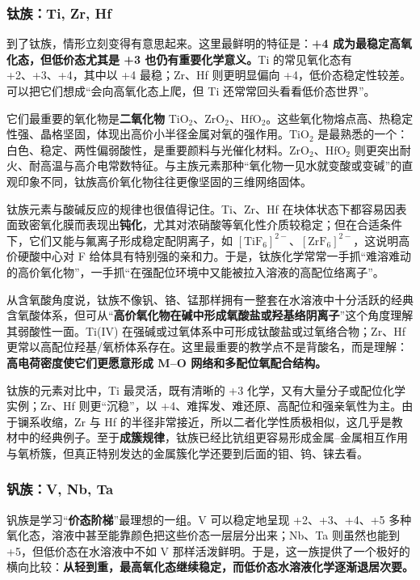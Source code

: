 \documentclass[UTF8]{ctexbook}
\begin{document}
\subsubsection{钛族：Ti, Zr, Hf}

到了钛族，情形立刻变得有意思起来。这里最鲜明的特征是：\textbf{+4 成为最稳定高氧化态，但低价态尤其是 +3 也仍有重要化学意义。}Ti 的常见氧化态有 +2、+3、+4，其中以 +4 最稳；Zr、Hf 则更明显偏向 +4，低价态稳定性较差。可以把它们想成“会向高氧化态上爬，但 Ti 还常常回头看看低价态世界”。

它们最重要的氧化物是\textbf{二氧化物} $\mathrm{TiO_2}$、$\mathrm{ZrO_2}$、$\mathrm{HfO_2}$。这些氧化物熔点高、热稳定性强、晶格坚固，体现出高价小半径金属对氧的强作用。$\mathrm{TiO_2}$ 是最熟悉的一个：白色、稳定、两性偏弱酸性，是重要颜料与光催化材料。$\mathrm{ZrO_2}$、$\mathrm{HfO_2}$ 则更突出耐火、耐高温与高介电常数特征。与主族元素那种“氧化物一见水就变酸或变碱”的直观印象不同，钛族高价氧化物往往更像坚固的三维网络固体。

钛族元素与酸碱反应的规律也很值得记住。Ti、Zr、Hf 在块体状态下都容易因表面致密氧化膜而表现出\textbf{钝化}，尤其对浓硝酸等氧化性介质较稳定；但在合适条件下，它们又能与氟离子形成稳定配阴离子，如 $\mathrm{[TiF_6]^{2-}}$、$\mathrm{[ZrF_6]^{2-}}$，这说明高价硬酸中心对 F 给体具有特别强的亲和力。于是，钛族化学常常一手抓“难溶难动的高价氧化物”，一手抓“在强配位环境中又能被拉入溶液的高配位络离子”。

从含氧酸角度说，钛族不像钒、铬、锰那样拥有一整套在水溶液中十分活跃的经典含氧酸体系，但可从“\textbf{高价氧化物在碱中形成氧酸盐或羟基络阴离子}”这个角度理解其弱酸性一面。Ti(IV) 在强碱或过氧体系中可形成钛酸盐或过氧络合物；Zr、Hf 更常以高配位羟基/氧桥体系存在。这里最重要的教学点不是背酸名，而是理解：\textbf{高电荷密度使它们更愿意形成 M--O 网络和多配位氧配合结构。}

钛族的元素对比中，Ti 最灵活，既有清晰的 +3 化学，又有大量分子或配位化学实例；Zr、Hf 则更“沉稳”，以 +4、难挥发、难还原、高配位和强亲氧性为主。由于镧系收缩，Zr 与 Hf 的半径非常接近，所以二者化学性质极相似，这几乎是教材中的经典例子。至于\textbf{成簇规律}，钛族已经比钪组更容易形成金属--金属相互作用与氧桥簇，但真正特别发达的金属簇化学还要到后面的钼、钨、铼去看。

\subsubsection{钒族：V, Nb, Ta}

钒族是学习“\textbf{价态阶梯}”最理想的一组。V 可以稳定地呈现 +2、+3、+4、+5 多种氧化态，溶液中甚至能靠颜色把这些价态一层层分出来；Nb、Ta 则虽然也能到 +5，但低价态在水溶液中不如 V 那样活泼鲜明。于是，这一族提供了一个极好的横向比较：\textbf{从轻到重，最高氧化态继续稳定，而低价态水溶液化学逐渐退居次要。}
\end{document}
